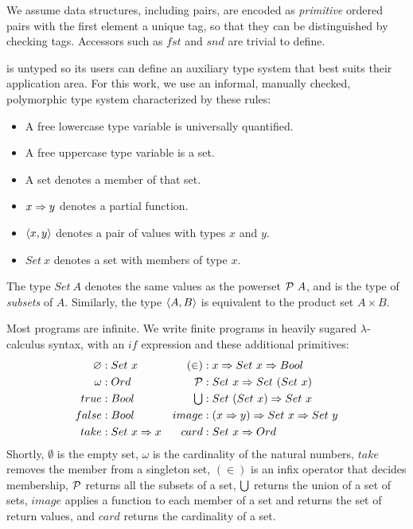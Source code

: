 \documentclass[preprint]{sigplanconf}
\begin{document}
We assume data structures, including pairs, are encoded as \emph{primitive} ordered pairs with the first element a unique tag, so that they can be distinguished by checking tags.
Accessors such as $fst$ and $snd$ are trivial to define.

\lzfclang is untyped so its users can define an auxiliary type system that best suits their application area.
For this work, we use an informal, manually checked, polymorphic type system characterized by these rules:
\begin{itemize}
	\item A free lowercase type variable is universally quantified.
	\item A free uppercase type variable is a set.
	\item A set denotes a member of that set.
	\item $x \Rightarrow y$ denotes a partial function.
	\item $\left\langle{x,y}\right\rangle$ denotes a pair of values with types $x$ and $y$.
	\item $Set~x$ denotes a set with members of type $x$.
\end{itemize}
The type $Set~A$ denotes the same values as the powerset $\mathcal{P}~A$, and is the type of \emph{subsets} of $A$.
Similarly, the type $\left\langle{A,B}\right\rangle$ is equivalent to the product set $A \times B$.

Most \lzfclang programs are infinite.
We write finite programs in heavily sugared $\lambda$-calculus syntax, with an $if$ expression and these additional primitives:
\begin{equation}
\begin{aligned}
	\begin{aligned}
		\varnothing &: Set~x \\
		\omega &: Ord \\
		true &: Bool \\
		false &: Bool \\
		take &: Set~x \Rightarrow x \\
	\end{aligned}
	&\ \ \ 
	\begin{aligned}
		(\in) &: x \Rightarrow Set~x \Rightarrow Bool \\
		\mathcal{P} &: Set~x \Rightarrow Set~(Set~x) \\
		\textstyle\bigcup &: Set~(Set~x) \Rightarrow Set~x \\
		image &: (x \Rightarrow y) \Rightarrow Set~x \Rightarrow Set~y \\
		card &: Set~x \Rightarrow Ord \\
	\end{aligned} \\
\end{aligned}
\label{eqn:lzfc-prims}
\end{equation}
Shortly, $\emptyset$ is the empty set, $\omega$ is the cardinality of the natural numbers, $take$ removes the member from a singleton set, $(\in)$ is an infix operator that decides membership, $\mathcal{P}$ returns all the subsets of a set, $\textstyle\bigcup$ returns the union of a set of sets, $image$ applies a function to each member of a set and returns the set of return values, and $card$ returns the cardinality of a set.
\end{document}

